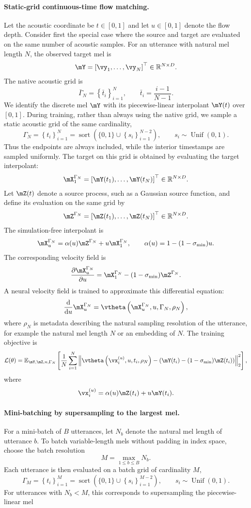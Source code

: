 \paragraph{Static-grid continuous-time flow matching.} Let the acoustic coordinate be $t \in [0,1]$ and let $u \in [0,1]$ denote the flow depth. Consider first the special case where the source and target are evaluated on the same number of acoustic samples. For an utterance with natural mel length $N$, the observed target mel is \[ \mY = \left[ \vy_1,\dots,\vy_N \right]^\top \in \mathbb{R}^{N \times D}. \] The native acoustic grid is \[ \bar{\Gamma}_N = \left\{ \bar{t}_i \right\}_{i=1}^{N}, \qquad \bar{t}_i = \frac{i-1}{N-1}. \] We identify the discrete mel $\mY$ with its piecewise-linear interpolant $\mY(t)$ over $[0,1]$. During training, rather than always using the native grid, we sample a static acoustic grid of the same cardinality, \[ \Gamma_N = \left\{ t_i \right\}_{i=1}^{N} = \operatorname{sort} \left( \{0,1\} \cup \left\{ s_i \right\}_{i=1}^{N-2} \right), \qquad s_i \sim \operatorname{Unif}(0,1). \] Thus the endpoints are always included, while the interior timestamps are sampled uniformly. The target on this grid is obtained by evaluating the target interpolant: \[ \mX_1^{\Gamma_N} = \left[ \mY(t_1),\dots,\mY(t_N) \right]^\top \in \mathbb{R}^{N \times D}. \] Let $\mZ(t)$ denote a source process, such as a Gaussian source function, and define its evaluation on the same grid by \[ \mZ^{\Gamma_N} = \left[ \mZ(t_1),\dots,\mZ(t_N) \right]^\top \in \mathbb{R}^{N \times D}. \] The simulation-free interpolant is \[ \mX_u^{\Gamma_N} = \alpha(u)\mZ^{\Gamma_N} + u\mX_1^{\Gamma_N}, \qquad \alpha(u) = 1-(1-\sigma_{\min})u. \] The corresponding velocity field is \[ \frac{\partial \mX_u^{\Gamma_N}}{\partial u} = \mX_1^{\Gamma_N} - (1-\sigma_{\min})\mZ^{\Gamma_N}. \] A neural velocity field is trained to approximate this differential equation: \[ \frac{\mathrm{d}}{\mathrm{d}u} \mX_u^{\Gamma_N} = \vtheta \left( \mX_u^{\Gamma_N}, u, \Gamma_N, \rho_N \right), \] where $\rho_N$ is metadata describing the natural sampling resolution of the utterance, for example the natural mel length $N$ or an embedding of $N$. The training objective is \[ \mathcal{L}(\theta) = \mathbb{E}_{\mY,\mZ,u,\Gamma_N} \left[ \frac{1}{N} \sum_{i=1}^{N} \left\| \vtheta \left( \vx_i^{(u)}, u, t_i, \rho_N \right) - \left( \mY(t_i) - (1-\sigma_{\min})\mZ(t_i) \right) \right\|_2^2 \right], \] where \[ \vx_i^{(u)} = \alpha(u)\mZ(t_i) + u\mY(t_i). \] \paragraph{Mini-batching by supersampling to the largest mel.} For a mini-batch of $B$ utterances, let $N_b$ denote the natural mel length of utterance $b$. To batch variable-length mels without padding in index space, choose the batch resolution \[ M = \max_{1 \leq b \leq B} N_b. \] Each utterance is then evaluated on a batch grid of cardinality $M$, \[ \Gamma_M = \left\{ t_i \right\}_{i=1}^{M} = \operatorname{sort} \left( \{0,1\} \cup \left\{ s_i \right\}_{i=1}^{M-2} \right), \qquad s_i \sim \operatorname{Unif}(0,1). \] For utterances with $N_b < M$, this corresponds to supersampling the piecewise-linear mel 